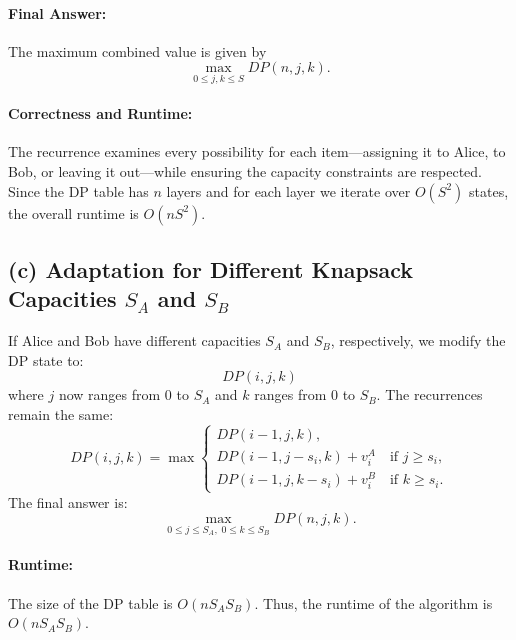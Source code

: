 \documentclass[11pt]{article}
\begin{document}
    \paragraph{Final Answer:}
    The maximum combined value is given by
    \[
    \max_{0\le j,k\le S} DP(n,j,k).
    \]
    
    \paragraph{Correctness and Runtime:}
    The recurrence examines every possibility for each item—assigning it to Alice, to Bob, or leaving it out—while ensuring the capacity constraints are respected. Since the DP table has \(n\) layers and for each layer we iterate over \(O(S^2)\) states, the overall runtime is \(O(nS^2)\).
    
    \subsection*{(c) Adaptation for Different Knapsack Capacities \(S_A\) and \(S_B\)}
    If Alice and Bob have different capacities \(S_A\) and \(S_B\), respectively, we modify the DP state to:
    \[
    DP(i,j,k)
    \]
    where \(j\) now ranges from \(0\) to \(S_A\) and \(k\) ranges from \(0\) to \(S_B\). The recurrences remain the same:
    \[
    DP(i,j,k) = \max \begin{cases}
    DP(i-1, j, k), \\[1mm]
    DP(i-1, j-s_i, k) + v_i^A \quad \text{if } j \ge s_i, \\[1mm]
    DP(i-1, j, k-s_i) + v_i^B \quad \text{if } k \ge s_i.
    \end{cases}
    \]
    The final answer is:
    \[
    \max_{0\le j\le S_A,\;0\le k\le S_B} DP(n,j,k).
    \]
    
    \paragraph{Runtime:}
    The size of the DP table is \(O(nS_A S_B)\). Thus, the runtime of the algorithm is \(O(nS_A S_B)\).
    

    \newpage
\end{document}
